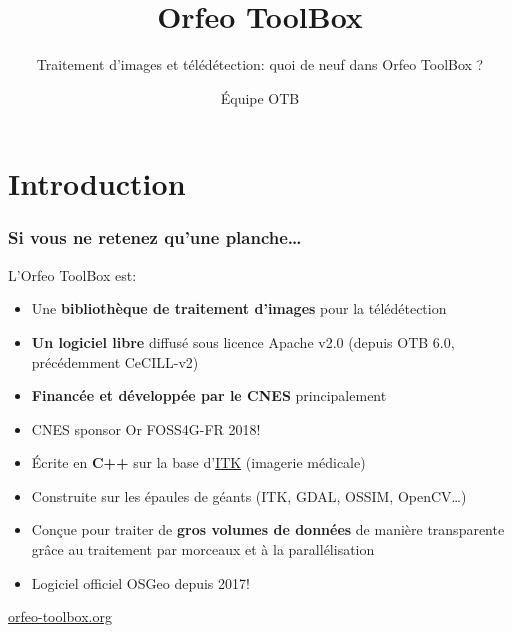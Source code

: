 \documentclass[8pt]{beamer}
\title{Orfeo ToolBox}
\subtitle{Traitement d'images et télédétection: quoi de neuf dans Orfeo ToolBox ?}
\author{Équipe OTB}%
\date{}
\begin{document}
\begin{frame}
\titlepage
\end{frame}

\section*{Introduction}

\begin{frame}
\frametitle{Si vous ne retenez qu'une planche\ldots}
\begin{block}{L'Orfeo ToolBox est:}
\begin{itemize}
\item Une \textbf{bibliothèque de traitement d'images} pour la télédétection
\item \textbf{Un logiciel libre} diffusé sous licence Apache v2.0 (depuis OTB 6.0, précédemment CeCILL-v2)
\item \textbf{Financée et développée par le CNES} principalement 
\item \alert{CNES sponsor Or FOSS4G-FR 2018!}
\item Écrite en \textbf{C++} sur la base d'\href{www.itk.org}{ITK} (imagerie médicale)
\item Construite sur les épaules de géants (ITK, GDAL, OSSIM, OpenCV\ldots)
\item Conçue pour traiter de \textbf{gros volumes de données} de manière transparente grâce au traitement par morceaux et à la parallélisation
\item Logiciel officiel OSGeo depuis 2017!
\end{itemize}
\end{block}

\begin{center}
{\huge\textcolor{red}{\href{http://www.orfeo-toolbox.org}{orfeo-toolbox.org}}}
\end{center}

\end{frame}
\end{document}
